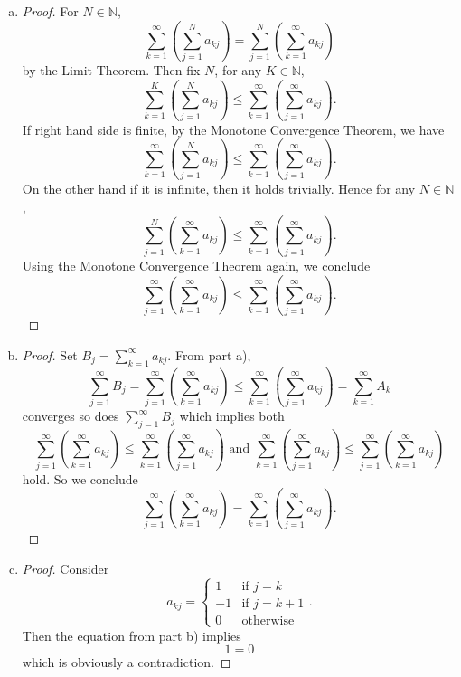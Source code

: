 \documentclass{report}
\begin{document}
\vspace{12pt}
\begin{Exercise}
\begin{enumerate}[a)]
\item 
\begin{proof}
For $N\in\mathbb{N}$, $$ \sum_{k=1}^{\infty}\left( \sum_{j=1}^{N}a_{kj} \right) = \sum_{j=1}^{N}\left( \sum_{k=1}^{\infty}a_{kj} \right) $$ by the Limit Theorem. Then fix $N$, for any $K\in\mathbb{N}$, $$ \sum_{k=1}^{K}\left( \sum_{j=1}^{N}a_{kj} \right) \leq \sum_{k=1}^{\infty}\left( \sum_{j=1}^{\infty}a_{kj} \right).$$
If right hand side is finite, by the Monotone Convergence Theorem, we have $$\sum_{k=1}^{\infty}\left( \sum_{j=1}^{N}a_{kj} \right) \leq \sum_{k=1}^{\infty}\left( \sum_{j=1}^{\infty}a_{kj} \right).$$
On the other hand if it is infinite, then it holds trivially. Hence for any $N\in\mathbb{N}$, $$\sum_{j=1}^{N}\left( \sum_{k=1}^{\infty}a_{kj} \right) \leq \sum_{k=1}^{\infty}\left( \sum_{j=1}^{\infty}a_{kj} \right).$$ Using the Monotone Convergence Theorem again, we conclude $$\sum_{j=1}^{\infty}\left( \sum_{k=1}^{\infty}a_{kj} \right) \leq \sum_{k=1}^{\infty}\left( \sum_{j=1}^{\infty}a_{kj} \right).$$
\end{proof}

\item
\begin{proof}
Set $B_j = \sum_{k=1}^{\infty}a_{kj}$. From part a), $$ \sum_{j=1}^{\infty}B_j = \sum_{j=1}^{\infty}\left( \sum_{k=1}^{\infty}a_{kj} \right) \leq \sum_{k=1}^{\infty}\left( \sum_{j=1}^{\infty}a_{kj} \right) = \sum_{k=1}^{\infty}A_k$$ converges so does $\sum_{j=1}^{\infty}B_j$ which implies both $$\sum_{j=1}^{\infty}\left( \sum_{k=1}^{\infty}a_{kj} \right) \leq \sum_{k=1}^{\infty}\left( \sum_{j=1}^{\infty}a_{kj} \right) \mbox{ and } \sum_{k=1}^{\infty}\left( \sum_{j=1}^{\infty}a_{kj} \right) \leq \sum_{j=1}^{\infty}\left( \sum_{k=1}^{\infty}a_{kj} \right) $$ hold. So we conclude $$\sum_{j=1}^{\infty}\left( \sum_{k=1}^{\infty}a_{kj} \right) = \sum_{k=1}^{\infty}\left( \sum_{j=1}^{\infty}a_{kj} \right).$$
\end{proof}

\item
\begin{proof}
Consider $$a_{kj} = \begin{cases}1 & \mbox{if } j=k \\
-1 & \mbox{if }j=k+1 \\
0 & \mbox{otherwise} \end{cases}.$$
Then the equation from part b) implies $$ 1 = 0 $$ which is obviously a contradiction.
\end{proof}
\end{enumerate}
\end{Exercise}
\end{document}
